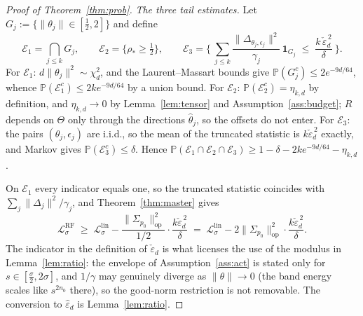 \documentclass[11pt]{article}
\theoremstyle{remark}
\newcommand{\Sig}{\Sigma_{p_0}}
\newcommand{\op}[1]{\lVert #1 \rVert_{\mathrm{op}}}
\begin{document}
\begin{proof}[Proof of Theorem~\ref{thm:prob}]

\emph{The three tail estimates.} Let $G_j := \{\lVert\theta_j\rVert \in [\tfrac12, 2]\}$ and define
\[
\mathcal E_1 = \bigcap_{j\le k} G_j,
\qquad
\mathcal E_2 = \Big\{\rho_* \ge \tfrac12\Big\},
\qquad
\mathcal E_3 = \Big\{\ \sum_{j\le k}\frac{\lVert\Delta_{\theta_j,\epsilon_j}\rVert^2}{\gamma_j}\,\mathbf 1_{G_j} \;\le\; \frac{k\,\check\varepsilon_d^{\,2}}{\delta}\ \Big\}.
\]
For $\mathcal E_1$: $d\lVert\theta_j\rVert^2 \sim \chi^2_d$, and the Laurent--Massart bounds give $\mathbb P(G_j^c) \le 2e^{-9d/64}$, whence $\mathbb P(\mathcal E_1^c) \le 2ke^{-9d/64}$ by a union bound. For $\mathcal E_2$: $\mathbb P(\mathcal E_2^c) = \eta_{k,d}$ by definition, and $\eta_{k,d} \to 0$ by Lemma~\ref{lem:tensor} and Assumption~\ref{ass:budget}; $R$ depends on $\Theta$ only through the directions $\hat\theta_j$, so the offsets do not enter. For $\mathcal E_3$: the pairs $(\theta_j,\epsilon_j)$ are i.i.d., so the mean of the truncated statistic is $k\check\varepsilon_d^{\,2}$ exactly, and Markov gives $\mathbb P(\mathcal E_3^c) \le \delta$. Hence $\mathbb P(\mathcal E_1\cap\mathcal E_2\cap\mathcal E_3) \ge 1 - \delta - 2ke^{-9d/64} - \eta_{k,d}$.

On $\mathcal E_1$ every indicator equals one, so the truncated statistic coincides with $\sum_j \lVert\Delta_j\rVert^2/\gamma_j$, and Theorem~\ref{thm:master} gives
\[
\mathcal L^{\mathrm{RF}}_\sigma \;\ge\; \mathcal L^{\mathrm{lin}}_\sigma - \frac{\op{\Sig}^{2}}{1/2}\cdot\frac{k\check\varepsilon_d^{\,2}}{\delta}
\;=\; \mathcal L^{\mathrm{lin}}_\sigma - 2\op{\Sig}^{2}\cdot\frac{k\check\varepsilon_d^{\,2}}{\delta}.
\]
The indicator in the definition of $\check\varepsilon_d$ is what licenses the use of the modulus in Lemma~\ref{lem:ratio}: the envelope of Assumption~\ref{ass:act} is stated only for $s \in [\tfrac\sigma2, 2\sigma]$, and $1/\gamma$ may genuinely diverge as $\lVert\theta\rVert \to 0$ (the band energy scales like $s^{2n_0}$ there), so the good-norm restriction is not removable. The conversion to $\hat\varepsilon_d$ is Lemma~\ref{lem:ratio}.


\end{proof}
\end{document}

